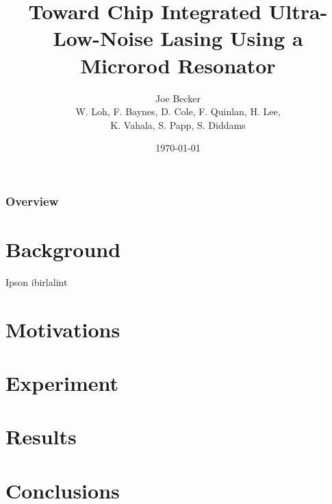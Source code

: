 \documentclass{beamer}
\title[Microrod Lasing]{Toward Chip Integrated Ultra-Low-Noise Lasing Using a Microrod Resonator} %
\author[J. Becker]{Joe Becker \\
\scriptsize{W. Loh, F. Baynes, D. Cole, F. Quinlan, H. Lee,\\
K. Vahala, S. Papp, S. Diddams}} %
\institute[NIST] %
{
National Institute of Standards and Technology\\ %
\medskip
\textit{Joe.Becker@nist.gov} %
}
\date{\today} %
\begin{document}
\begin{frame}
\titlepage %
\end{frame}

\begin{frame}
\frametitle{Overview} %
\tableofcontents %
\end{frame}



\section{Background} 
\begin{frame}
Ipson ibirlalint
\end{frame}

\section{Motivations}
\section{Experiment}
\section{Results}
\section{Conclusions}
\end{document}
